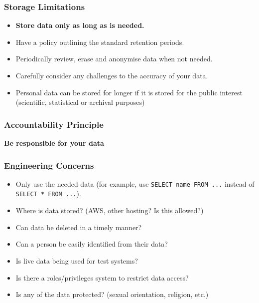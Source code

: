 \subsubsection{Storage Limitations}\label{ssub:storage_limitations}

\begin{itemize}
	\item \textbf{Store data only as long as is needed.}
	\item Have a policy outlining the standard retention periods.
	\item Periodically review, erase and anonymise data when not needed.
	\item Carefully consider any challenges to the accuracy of your data.
	\item Personal data can be stored for longer if it is stored for the public interest (scientific, statistical or archival purposes)
\end{itemize}

\subsubsection{Accountability Principle}\label{ssub:accountability_principle}

\textbf{Be responsible for your data}

\subsubsection{Engineering Concerns}\label{ssub:engineering_concerns}
\begin{itemize}
	\item Only use the needed data (for example, use \texttt{SELECT name FROM ...} instead of \texttt{SELECT * FROM ...}).
	\item Where is data stored? (AWS, other hosting? Is this allowed?)
	\item Can data be deleted in a timely manner?
	\item Can a person be easily identified from their data?
	\item Is live data being used for test systems?
	\item Is there a roles/privileges system to restrict data access?
	\item Is any of the data protected? (sexual orientation, religion, etc.)
\end{itemize}

